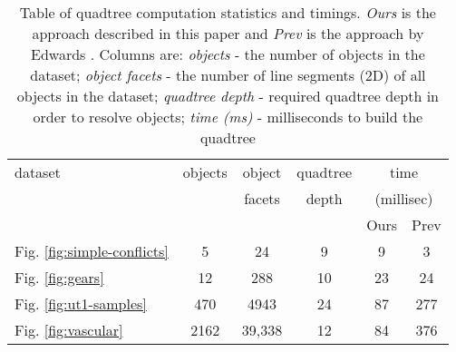 \documentclass[final,3p,times,twocolumn]{elsarticle}
\begin{document}

\begin{table}
  \centering
  \footnotesize{
  \begin{tabular}{lcc|c|cc}
    \toprule
    dataset & objects & object          & quadtree
    & \multicolumn{2}{c}{time} \\
            &         & facets          & depth
    & \multicolumn{2}{c}{(millisec)} \\
           &&&
    & Ours & Prev \\
    \hline

    Fig. \ref{fig:simple-conflicts} & 5 & 24 & 9 & 9 & 3 \\

    Fig. \ref{fig:gears} & 12 & 288 & 10 & 23 & 24 \\

    Fig. \ref{fig:ut1-samples} & 470 & 4943 & 24 & 87 & 277 \\

    Fig. \ref{fig:vascular} & 2162 & 39,338 & 12 & 84 & 376 \\

    \bottomrule
  \end{tabular}}
  \caption{Table of quadtree computation statistics and timings. \emph{Ours} is the approach described in this paper and \emph{Prev} is the approach by Edwards \etal \cite{edwards2015approximating}. Columns are: \emph{objects} - the number of objects in the dataset; \emph{object facets} - the number of line segments (2D) of all objects in the dataset; \emph{quadtree depth} - required quadtree depth in order to resolve objects; \emph{time (ms)} - milliseconds to build the quadtree }
  \label{tab:timings}
\end{table}
\end{document}
